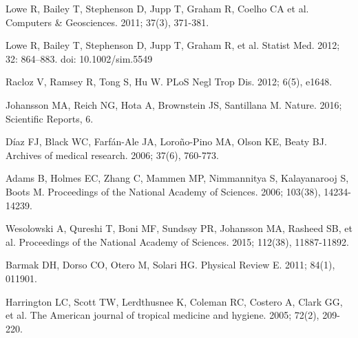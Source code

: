 \documentclass[final,leqno]{siamltexmm2}
\begin{document}
\begin{thebibliography}{10}
Lowe R, Bailey T, Stephenson D, Jupp T, Graham R, Coelho CA et al. 
\newblock  Computers \& Geosciences. 2011; 37(3), 371-381.


Lowe R, Bailey T, Stephenson D, Jupp T, Graham R, et al. 
\newblock Statist Med. 2012;  32: 864–883. doi: 10.1002/sim.5549

Racloz V, Ramsey R, Tong S,  Hu W. 
\newblock PLoS Negl Trop Dis. 2012; 6(5), e1648.


Johansson MA, Reich NG, Hota A, Brownstein JS,  Santillana M.
\newblock Nature. 2016; Scientific Reports, 6.



Díaz FJ, Black WC, Farfán-Ale JA, Loroño-Pino MA, Olson KE,  Beaty BJ. 
\newblock Archives of medical research. 2006; 37(6), 760-773.



Adams B, Holmes EC, Zhang C, Mammen MP, Nimmannitya S, Kalayanarooj S, Boots M.
\newblock Proceedings of the National Academy of Sciences. 2006; 103(38), 14234-14239.


Wesolowski A, Qureshi T, Boni MF, Sundsøy PR, Johansson MA, Rasheed SB, et al. 
 \newblock Proceedings of the National Academy of Sciences. 2015; 112(38), 11887-11892.


Barmak DH, Dorso CO, Otero M, Solari HG. 
\newblock Physical Review E. 2011;  84(1), 011901.




Harrington LC, Scott TW, Lerdthusnee K, Coleman RC, Costero A, Clark GG, et al. 
\newblock The American journal of tropical medicine and hygiene. 2005; 72(2), 209-220.



\end{thebibliography}
\end{document}
